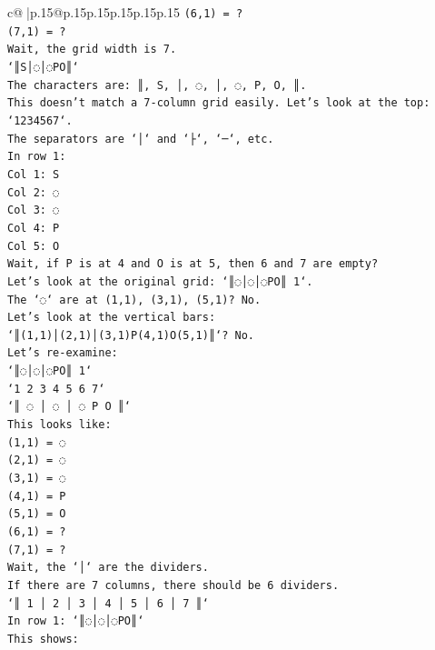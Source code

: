 \documentclass{article}
\begin{document}
{\begin{supertabular}{c@{$\;$}|p{.15\linewidth}@{}p{.15\linewidth}p{.15\linewidth}p{.15\linewidth}p{.15\linewidth}p{.15\linewidth}}
{{{\texttt{(6,1) = ?} \\
\texttt{(7,1) = ?} \\
\texttt{Wait, the grid width is 7.} \\
\texttt{`║S│◌│◌PO║`} \\
\texttt{The characters are: ║, S, │, ◌, │, ◌, P, O, ║.} \\
\texttt{This doesn't match a 7{-}column grid easily. Let's look at the top: `1234567`.} \\
\texttt{The separators are `│` and `├`, `─`, etc.} \\
\texttt{In row 1:} \\
\texttt{Col 1: S} \\
\texttt{Col 2: ◌} \\
\texttt{Col 3: ◌} \\
\texttt{Col 4: P} \\
\texttt{Col 5: O} \\
\texttt{Wait, if P is at 4 and O is at 5, then 6 and 7 are empty?} \\
\texttt{Let's look at the original grid: `║◌│◌│◌PO║ 1`.} \\
\texttt{The `◌` are at (1,1), (3,1), (5,1)? No.} \\
\texttt{Let's look at the vertical bars:} \\
\texttt{`║(1,1)│(2,1)│(3,1)P(4,1)O(5,1)║`? No.} \\
\texttt{Let's re{-}examine:} \\
\texttt{`║◌│◌│◌PO║ 1`} \\
\texttt{`1 2 3 4 5 6 7`} \\
\texttt{`║ ◌ │ ◌ │ ◌ P O ║`} \\
\texttt{This looks like:} \\
\texttt{(1,1) = ◌} \\
\texttt{(2,1) = ◌} \\
\texttt{(3,1) = ◌} \\
\texttt{(4,1) = P} \\
\texttt{(5,1) = O} \\
\texttt{(6,1) = ?} \\
\texttt{(7,1) = ?} \\
\texttt{Wait, the `│` are the dividers.} \\
\texttt{If there are 7 columns, there should be 6 dividers.} \\
\texttt{`║ 1 │ 2 │ 3 │ 4 │ 5 │ 6 │ 7 ║`} \\
\texttt{In row 1: `║◌│◌│◌PO║`} \\
\texttt{This shows:} \\
}}}
\end{supertabular}}
\end{document}
